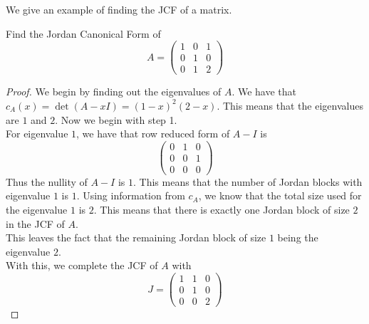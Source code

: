 \documentclass[a4paper]{article}
\begin{document}
We give an example of finding the JCF of a matrix. 

\begin{eg}{}{} Find the Jordan Canonical Form of $$A=\begin{pmatrix}
1 & 0 & 1\\
0 & 1 & 0\\
0 & 1 & 2
\end{pmatrix}$$ 
\begin{proof}
We begin by finding out the eigenvalues of $A$. We have that $c_A(x)=\det(A-xI)=(1-x)^2(2-x)$. This means that the eigenvalues are $1$ and $2$. Now we begin with step 1. \\
For eigenvalue $1$, we have that row reduced form of $A-I$ is $$\begin{pmatrix}
0 & 1 & 0\\
0 & 0 & 1\\
0 & 0 & 0
\end{pmatrix}$$
Thus the nullity of $A-I$ is $1$. This means that the number of Jordan blocks with eigenvalue $1$ is $1$. Using information from $c_A$, we know that the total size used for the eigenvalue $1$ is $2$. This means that there is exactly one Jordan block of size $2$ in the JCF of $A$. \\
This leaves the fact that the remaining Jordan block of size $1$ being the eigenvalue $2$. \\
With this, we complete the JCF of $A$ with $$J=\begin{pmatrix}
1 & 1 & 0\\
0 & 1 & 0\\
0 & 0 & 2
\end{pmatrix}$$


\end{proof}
\end{eg}
\end{document}
